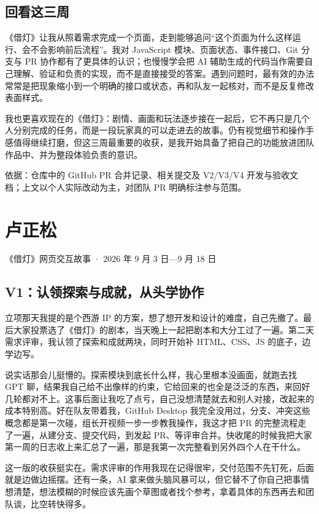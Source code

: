\subsection{回看这三周}

《借灯》让我从照着需求完成一个页面，走到能够追问“这个页面为什么这样运行、会不会影响前后流程”。我对 JavaScript 模块、页面状态、事件接口、Git 分支与 PR 协作都有了更具体的认识；也慢慢学会把 AI 辅助生成的代码当作需要自己理解、验证和负责的实现，而不是直接接受的答案。遇到问题时，最有效的办法常常是把现象缩小到一个明确的接口或状态，再和队友一起核对，而不是反复修改表面样式。

我也更喜欢现在的《借灯》：剧情、画面和玩法逐步接在一起后，它不再只是几个人分别完成的任务，而是一段玩家真的可以走进去的故事。仍有视觉细节和操作手感值得继续打磨，但这三周最重要的收获，是我开始具备了把自己的功能放进团队作品中、并为整段体验负责的意识。

\bigskip
{\small\color{black!55} 依据：仓库中的 GitHub PR 合并记录、相关提交及 V2/V3/V4 开发与验收文档；上文以个人实际改动为主，对团队 PR 明确标注参与范围。\par}

\section{卢正松}

{\small\color{black!55}《借灯》网页交互故事 · 2026 年 9 月 3 日—9 月 18 日\par}
\subsection{V1：认领探索与成就，从头学协作}

立项那天我提的是个西游 IP 的方案，想了想开发和设计的难度，自己先撤了。最后大家投票选了《借灯》的剧本，当天晚上一起把剧本和大分工过了一遍。第二天需求评审，我认领了探索和成就两块，同时开始补 HTML、CSS、JS 的底子，边学边写。

说实话那会儿挺懵的。探索模块到底长什么样，我心里根本没画面，就跑去找 GPT 聊，结果我自己给不出像样的约束，它给回来的也全是泛泛的东西，来回好几轮都对不上。这事后面让我吃了点亏，自己没想清楚就去和别人对接，改起来的成本特别高。好在队友带着我，GitHub Desktop 我完全没用过，分支、冲突这些概念都是第一次碰，组长开视频一步一步教我操作，我这才把 PR 的完整流程走了一遍，从建分支、提交代码，到发起 PR、等评审合并。快收尾的时候我把大家第一周的日志收上来汇总了一遍，那是我第一次完整看到另外四个人在干什么。

这一版的收获挺实在。需求评审的作用我现在记得很牢，交付范围不先钉死，后面就是边做边摇摆。还有一条，AI 拿来做头脑风暴可以，但它替不了你自己把事情想清楚，想法模糊的时候应该先画个草图或者找个参考，拿着具体的东西再去和团队谈，比空转快得多。


